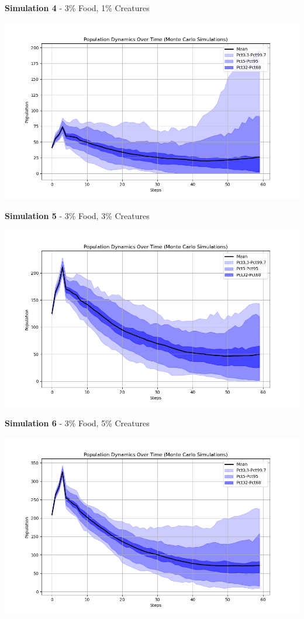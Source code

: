\documentclass{article}
\begin{document}
\textbf{Simulation 4} - 3\% Food, 1\% Creatures
\begin{center}
    \includegraphics[scale=0.5]{tests/4_population_dynamics.png}
\end{center}
\textbf{Simulation 5} - 3\% Food, 3\% Creatures
\begin{center}
    \includegraphics[scale=0.5]{tests/5_population_dynamics.png}
\end{center}
\textbf{Simulation 6} - 3\% Food, 5\% Creatures
\begin{center}
    \includegraphics[scale=0.5]{tests/6_population_dynamics.png}
\end{center}
\end{document}
